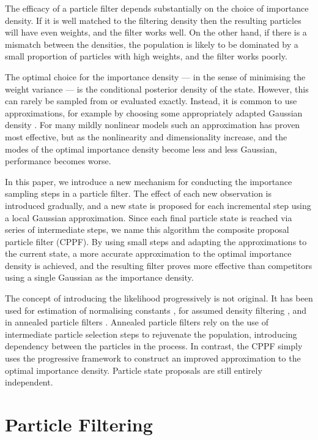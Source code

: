 \documentclass[conference]{IEEEtran}
\begin{document}
The efficacy of a particle filter depends substantially on the choice of importance density. If it is well matched to the filtering density then the resulting particles will have even weights, and the filter works well. On the other hand, if there is a mismatch between the densities, the population is likely to be dominated by a small proportion of particles with high weights, and the filter works poorly.

The optimal choice for the importance density --- in the sense of minimising the weight variance --- is the conditional posterior density of the state. However, this can rarely be sampled from or evaluated exactly. Instead, it is common to use approximations, for example by choosing some appropriately adapted Gaussian density \cite{Doucet2000a}. For many mildly nonlinear models such an approximation has proven most effective, but as the nonlinearity and dimensionality increase, and the modes of the optimal importance density become less and less Gaussian, performance becomes worse.

In this paper, we introduce a new mechanism for conducting the importance sampling steps in a particle filter. The effect of each new observation is introduced gradually, and a new state is proposed for each incremental step using a local Gaussian approximation. Since each final particle state is reached via series of intermediate steps, we name this algorithm the composite proposal particle filter (CPPF). By using small steps and adapting the approximations to the current state, a more accurate approximation to the optimal importance density is achieved, and the resulting filter proves more effective than competitors using a single Gaussian as the importance density.

The concept of introducing the likelihood progressively is not original. It has been used for estimation of normalising constants \cite{Gelman1998}, for assumed density filtering \cite{Hanebeck2003a,Hanebeck2012,Hagmar2011}, and in annealed particle filters \cite{Godsill2001b,Neal2001,Gall2007,Deutscher2000}. Annealed particle filters rely on the use of intermediate particle selection steps to rejuvenate the population, introducing dependency between the particles in the process. In contrast, the CPPF simply uses the progressive framework to construct an improved approximation to the optimal importance density. Particle state proposals are still entirely independent.



\section{Particle Filtering}
\end{document}

